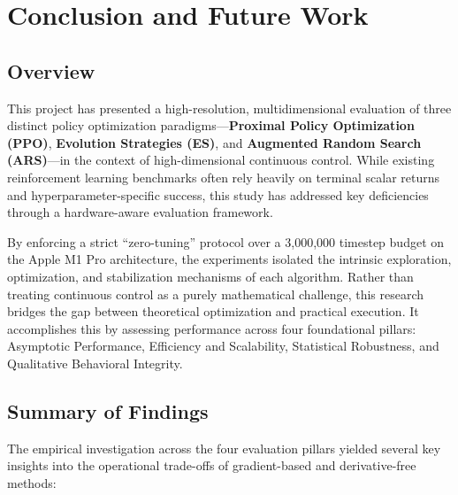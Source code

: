 %
%
\chapter{Conclusion and Future Work}
\label{chap:conclusion}
\setlength{\parskip}{1em}
%

\section{Overview}

This project has presented a high-resolution, multidimensional evaluation of three distinct policy optimization paradigms—\textbf{Proximal Policy Optimization (PPO)}, \textbf{Evolution Strategies (ES)}, and \textbf{Augmented Random Search (ARS)}—in the context of high-dimensional continuous control. While existing reinforcement learning benchmarks often rely heavily on terminal scalar returns and hyperparameter-specific success, this study has addressed key deficiencies through a hardware-aware evaluation framework. 

By enforcing a strict ``zero-tuning'' protocol over a 3,000,000 timestep budget on the Apple M1 Pro architecture, the experiments isolated the intrinsic exploration, optimization, and stabilization mechanisms of each algorithm. Rather than treating continuous control as a purely mathematical challenge, this research bridges the gap between theoretical optimization and practical execution. It accomplishes this by assessing performance across four foundational pillars: Asymptotic Performance, Efficiency and Scalability, Statistical Robustness, and Qualitative Behavioral Integrity.

\section{Summary of Findings}

The empirical investigation across the four evaluation pillars yielded several key insights into the operational trade-offs of gradient-based and derivative-free methods:

